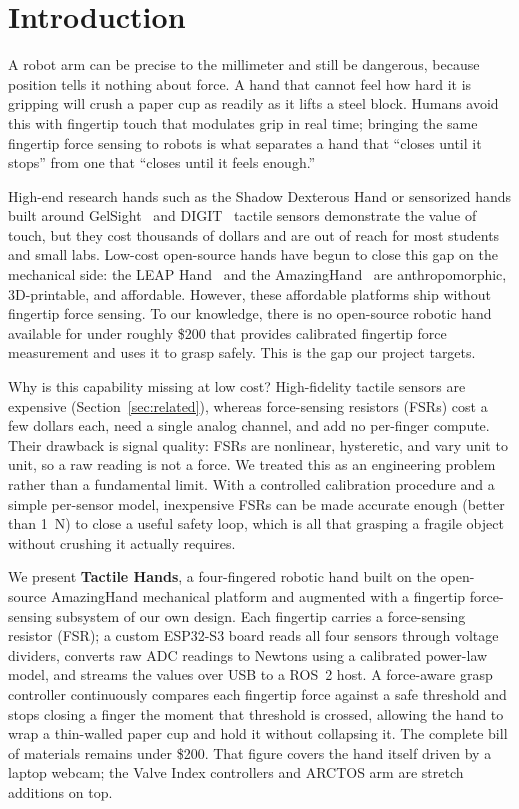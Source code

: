 \documentclass[acmlarge,screen,nonacm]{acmart}
\begin{document}
\section{Introduction}
A robot arm can be precise to the millimeter and still be dangerous, because
position tells it nothing about force. A hand that cannot feel how hard it is
gripping will crush a paper cup as readily as it lifts a steel block.
Humans avoid this with fingertip touch that modulates grip in real time;
bringing the same fingertip force sensing to robots is what separates a hand
that ``closes until it stops'' from one that ``closes until it feels enough.''

High-end research hands such as the Shadow Dexterous Hand or sensorized hands
built around GelSight~\cite{yuan2017gelsight} and DIGIT~\cite{lambeta2020digit}
tactile sensors demonstrate the value of touch, but they cost thousands of
dollars and are out of reach for most students and small labs.
Low-cost open-source hands have begun to close this gap on the mechanical side:
the LEAP Hand~\cite{shaw2023leap} and the AmazingHand~\cite{pollen2025amazinghand}
are anthropomorphic, 3D-printable, and affordable. However, these affordable
platforms ship without fingertip force sensing. To our knowledge, there is no
open-source robotic hand available for under roughly \$200 that provides
calibrated fingertip force measurement and uses it to grasp safely. This is the
gap our project targets.

Why is this capability missing at low cost? High-fidelity tactile sensors are
expensive (Section~\ref{sec:related}), whereas force-sensing resistors (FSRs)
cost a few dollars each, need a single analog channel, and add no per-finger
compute. Their drawback is
signal quality: FSRs are nonlinear, hysteretic, and vary unit to unit, so a raw
reading is not a force. We treated this as an engineering problem rather than a
fundamental limit. With a controlled calibration procedure and a simple
per-sensor model, inexpensive FSRs can be made accurate enough (better than
1~N) to close a useful safety loop, which is all that grasping a fragile object
without crushing it actually requires.

We present \textbf{Tactile Hands}, a four-fingered robotic hand built on the
open-source AmazingHand mechanical platform and augmented with a fingertip
force-sensing subsystem of our own design. Each fingertip carries a
force-sensing resistor (FSR); a custom ESP32-S3 board reads all four sensors
through voltage dividers, converts raw ADC readings to Newtons using a
calibrated power-law model, and streams the values over USB to a ROS~2 host. A
force-aware grasp controller continuously compares each fingertip force against
a safe threshold and stops closing a finger the moment that threshold is
crossed, allowing the hand to wrap a thin-walled paper cup and hold it without
collapsing it. The complete bill of materials remains under \$200. That figure
covers the hand itself driven by a laptop webcam; the Valve Index controllers
and ARCTOS arm are stretch additions on top.
\end{document}
